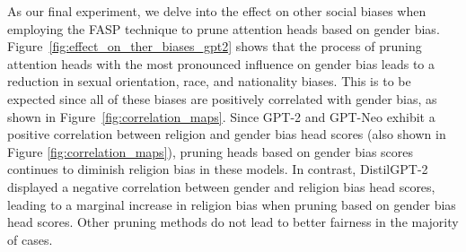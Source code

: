 \documentclass[letterpaper]{article} %
\newcommand{\goncalo}[1]
{\textcolor{orange}{{\bf}{\em #1}{\bf}}}
\begin{document}
As our final experiment, we delve into the effect on other social biases when employing the FASP technique to prune attention heads based on gender bias. Figure~\ref{fig:effect_on_ther_biases_gpt2} shows that the process of pruning attention heads with the most pronounced influence on gender bias leads to a reduction in sexual orientation, race, and nationality biases. This is to be expected since all of these biases are positively correlated with gender bias, as shown in Figure~\ref{fig:correlation_maps}. Since GPT-2 and GPT-Neo exhibit a positive correlation between religion and gender bias head scores (also shown in Figure \ref{fig:correlation_maps}), pruning heads based on gender bias scores continues to diminish religion bias in these models. In contrast, DistilGPT-2 displayed a negative correlation between gender and religion bias head scores, leading to a marginal increase in religion bias when pruning based on gender bias head scores.  Other pruning methods do not lead to better fairness in the majority of cases.





\end{document}
